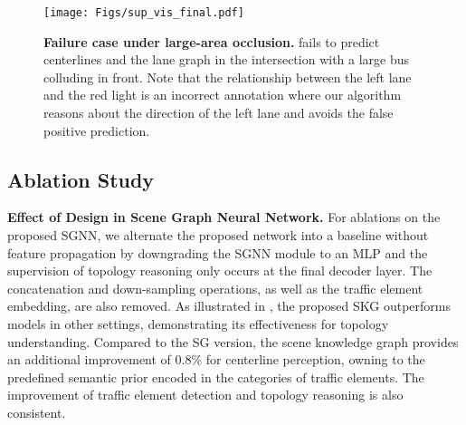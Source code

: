 \begin{figure*}[t!]
  \centering
    \texttt{[image: Figs/sup\_vis\_final.pdf]}
     \vspace{-15pt}
  \caption{
  \textbf{Failure case under large-area occlusion.} \algname fails to predict centerlines and the lane graph in the intersection with a large bus colluding in front. Note that the relationship between the left lane and the red light is an incorrect annotation where our algorithm reasons about the direction of the left lane and avoids the false positive prediction.
  }
  \label{fig:supp-vis-occlusion}
\end{figure*}


\begin{table}[t!]
    \centering
    \caption{\textbf{Ablation on the number of GNN layers} in the scene knowledge graph. Model performance drops as the number of SGNN layers increases.}
    \label{tab:ab:gnnlayer}
    \vspace{-5px}
\end{table} 



\subsection{Ablation Study}
\label{sec:exp-ablation}


\noindent
\textbf{Effect of Design in Scene Graph Neural Network.}
For ablations on the proposed SGNN, we alternate the proposed network into a baseline without feature propagation by downgrading the SGNN module to an MLP and the supervision of topology reasoning only occurs at the final decoder layer. The concatenation and down-sampling operations, as well as the traffic element embedding, are also removed. As illustrated in , the proposed SKG outperforms models in other settings, demonstrating its effectiveness for topology understanding.
Compared to the SG version, the scene knowledge graph provides an additional improvement of 0.8\% for centerline perception, owning to the predefined semantic prior encoded in the categories of traffic elements.
The improvement of traffic element detection and topology reasoning is also consistent.



